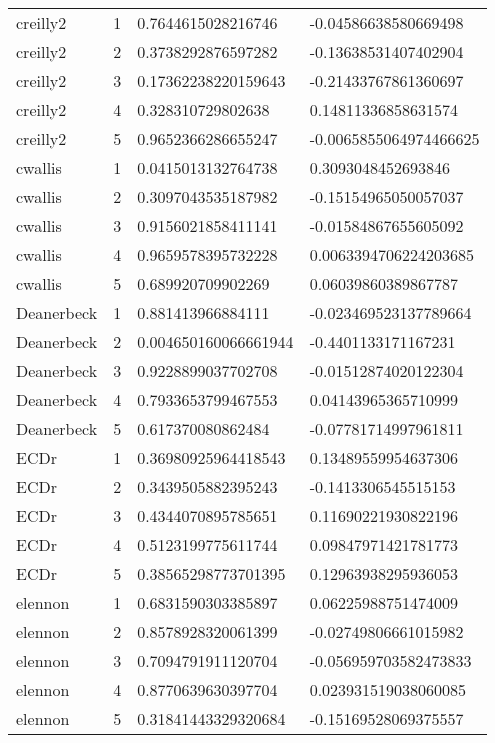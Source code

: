 \begin{longtable}{@{}lcll@{}}
      creilly2 & 1 & 0.7644615028216746 & -0.04586638580669498 \\
      creilly2 & 2 & 0.3738292876597282 & -0.13638531407402904 \\
      creilly2 & 3 & 0.17362238220159643 & -0.21433767861360697 \\
      creilly2 & 4 & 0.328310729802638 & 0.14811336858631574 \\
      creilly2 & 5 & 0.9652366286655247 & -0.0065855064974466625 \\
      cwallis & 1 & 0.0415013132764738 & 0.3093048452693846 \\
      cwallis & 2 & 0.3097043535187982 & -0.15154965050057037 \\
      cwallis & 3 & 0.9156021858411141 & -0.01584867655605092 \\
      cwallis & 4 & 0.9659578395732228 & 0.0063394706224203685 \\
      cwallis & 5 & 0.689920709902269 & 0.06039860389867787 \\
      Deanerbeck & 1 & 0.881413966884111 & -0.023469523137789664 \\
      Deanerbeck & 2 & 0.004650160066661944 & -0.4401133171167231 \\
      Deanerbeck & 3 & 0.9228899037702708 & -0.01512874020122304 \\
      Deanerbeck & 4 & 0.7933653799467553 & 0.04143965365710999 \\
      Deanerbeck & 5 & 0.617370080862484 & -0.07781714997961811 \\
      ECDr & 1 & 0.36980925964418543 & 0.13489559954637306 \\
      ECDr & 2 & 0.3439505882395243 & -0.1413306545515153 \\
      ECDr & 3 & 0.4344070895785651 & 0.11690221930822196 \\
      ECDr & 4 & 0.5123199775611744 & 0.09847971421781773 \\
      ECDr & 5 & 0.38565298773701395 & 0.12963938295936053 \\
      elennon & 1 & 0.6831590303385897 & 0.06225988751474009 \\
      elennon & 2 & 0.8578928320061399 & -0.02749806661015982 \\
      elennon & 3 & 0.7094791911120704 & -0.056959703582473833 \\
      elennon & 4 & 0.8770639630397704 & 0.023931519038060085 \\
      elennon & 5 & 0.31841443329320684 & -0.15169528069375557 \\

\end{longtable}
